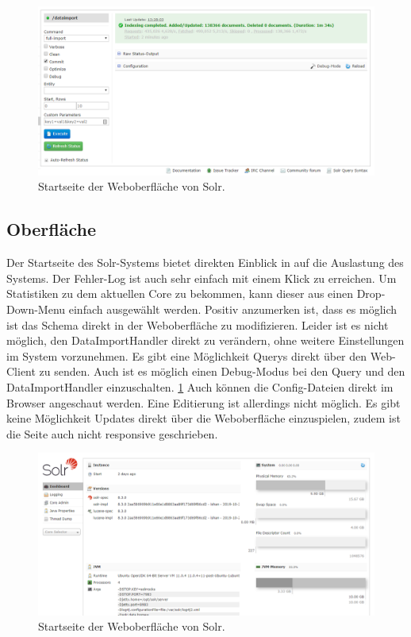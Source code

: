 \begin{figure}
	\centering
	\includegraphics[width=1\linewidth]{images/solr_indexing_time.png}
	\caption{Startseite der Weboberfläche von Solr.}
	\label{img:solrIndexTime}
\end{figure}

\subsection{Oberfläche}

Der Startseite des Solr-Systems bietet direkten Einblick in auf die Auslastung des Systems. Der Fehler-Log ist auch sehr einfach mit einem Klick zu erreichen. Um Statistiken zu dem aktuellen Core zu bekommen, kann dieser aus einen Drop-Down-Menu einfach ausgewählt werden. Positiv anzumerken ist, dass es möglich ist das Schema direkt in der Weboberfläche zu modifizieren. Leider ist es nicht möglich, den DataImportHandler direkt zu verändern, ohne weitere Einstellungen im System vorzunehmen. Es gibt eine Möglichkeit Querys direkt über den Web-Client zu senden. Auch ist es möglich einen Debug-Modus bei den Query und den DataImportHandler einzuschalten. \ref{img:solrIndexTime} Auch können die Config-Dateien direkt im Browser angeschaut werden. Eine Editierung ist allerdings nicht möglich.
Es gibt keine Möglichkeit Updates direkt über die Weboberfläche einzuspielen, zudem ist die Seite auch nicht responsive geschrieben. 

\begin{figure}
	\centering
	\includegraphics[width=1\linewidth]{images/solr_interface.png}
	\caption{Startseite der Weboberfläche von Solr.}
	\label{img:solrInterface}
\end{figure}


